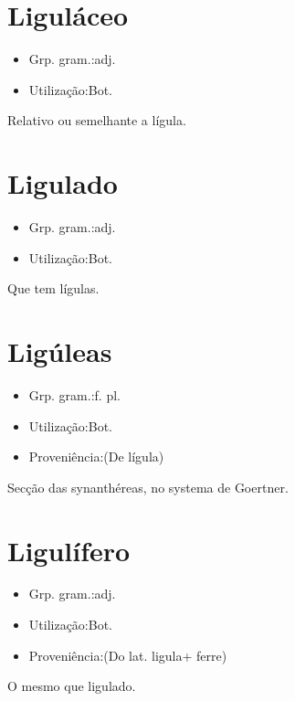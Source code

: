 \section{Liguláceo}
\begin{itemize}
\item {Grp. gram.:adj.}
\end{itemize}
\begin{itemize}
\item {Utilização:Bot.}
\end{itemize}
Relativo ou semelhante a lígula.
\section{Ligulado}
\begin{itemize}
\item {Grp. gram.:adj.}
\end{itemize}
\begin{itemize}
\item {Utilização:Bot.}
\end{itemize}
Que tem lígulas.
\section{Ligúleas}
\begin{itemize}
\item {Grp. gram.:f. pl.}
\end{itemize}
\begin{itemize}
\item {Utilização:Bot.}
\end{itemize}
\begin{itemize}
\item {Proveniência:(De \textunderscore lígula\textunderscore )}
\end{itemize}
Secção das synanthéreas, no systema de Goertner.
\section{Ligulífero}
\begin{itemize}
\item {Grp. gram.:adj.}
\end{itemize}
\begin{itemize}
\item {Utilização:Bot.}
\end{itemize}
\begin{itemize}
\item {Proveniência:(Do lat. \textunderscore ligula\textunderscore  + \textunderscore ferre\textunderscore )}
\end{itemize}
O mesmo que \textunderscore ligulado\textunderscore .
